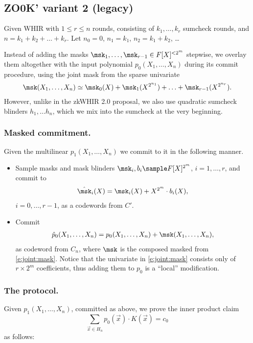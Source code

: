 \subsection{ZO0K' variant 2 (legacy)}
\label{s:zook:variant:2}

Given WHIR with $1\leq r\leq n$ rounds, consisting of $k_1,\ldots,k_r$ sumcheck rounds,
and $n = k_1 + k_2 + \ldots + k_r$.
Let $n_0 = 0$, $n_1 = k_1$, $n_2 = k_1 + k_2 $, \ldots

Instead of adding the masks $\msk_1,\ldots,\msk_{r-1}\in F[X]^{<2^m}$ stepwise, we overlay them altogether with the input polynomial $p_0(X_1,\ldots, X_n)$ during its commit procedure, using the joint mask 
from the sparse univariate
\begin{align}
\label{e:joint:mask}
\msk(X_1,\ldots,X_n) \simeq  \msk_0(X) + \msk_1(X^{2^{n_1}}) + \ldots + \msk_{r-1}(X^{2^{n_r}}).
\end{align}
However, unlike in the zkWHIR 2.0 proposal, we also use quadratic sumcheck
blinders $h_1,\ldots h_n$, which we mix into the sumcheck at the very beginning.

\subsubsection{Masked commitment.}
Given the multilinear $p_1(X_1,\ldots, X_n)$ we commit to it in the following manner.
\begin{itemize}
\item 
Sample masks and mask blinders $\msk_i, b_i \sample F[X]^{2^m}$, $i=1,\ldots, r$, and commit to
\[
\hat\msk_i(X) = \msk_i(X) + X^{2^m} \cdot b_i(X),
\]
$i=0,\ldots, r-1$, as a codewords from $C'$.

\item 
Commit
\begin{align*}
\hat p_0(X_1,\ldots, X_n) = p_0(X_1,\ldots, X_n) + \msk(X_1,\ldots, X_n),
\end{align*}
as codeword from $C_n$, where $\msk$ is the composed masked from \eqref{e:joint:mask}.
Notice that the univariate in \eqref{e:joint:mask} consists only of $r\times 2^m$ coefficients, thus adding them to $p_0$ is a ``local'' modification.
\end{itemize}

\subsubsection{The protocol.}
Given $p_1(X_1,\ldots, X_n)$, committed as above, we prove the inner product claim 
\[
\sum_{\vec x \in H_n} p_0(\vec x)\cdot K(\vec x) = c_0
\]
as follows:

